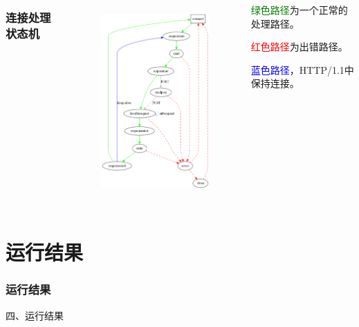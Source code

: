 \documentclass[10pt,dvipdfm]{beamer}
\begin{document}
\begin{frame}
	\begin{columns}
	\frametitle{连接处理状态机}
	
	\begin{column}{0.6\textwidth}
		\begin{figure}[htbp]
		\centering
		\includegraphics[height=7.5cm, width=7cm]{pics/state.eps}
		\end{figure}
	\end{column}
	
	\begin{column}{0.3\textwidth}
		\begin{block}{}
			\textcolor{green}{绿色路径}为一个正常的处理路径。\\
		\end{block}
		\begin{block}{}
			\textcolor{red}{红色路径}为出错路径。\\
		\end{block}
		\begin{block}{}	
			\textcolor{blue}{蓝色路径}，HTTP/1.1中保持连接。
		\end{block}
	\end{column}
	
	\end{columns}
	
\end{frame}

\section{运行结果}
\begin{frame}
	\frametitle{运行结果}
	\begin{center}
	{\Large
		四、运行结果
	}
	\end{center}
\end{frame}
\end{document}
